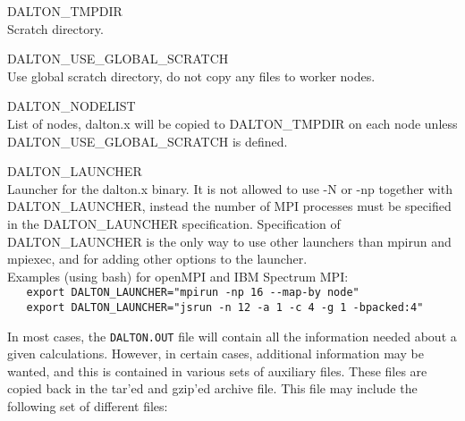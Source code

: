\begin{list}{--}{}
\item[DALTON\_TMPDIR \hfill] \hfill \\
 Scratch directory.
\item[DALTON\_USE\_GLOBAL\_SCRATCH \hfill] \hfill \\
 Use global scratch directory, do not copy any files to worker nodes.
\item[DALTON\_NODELIST \hfill] \hfill \\
 List of nodes, dalton.x will be copied to DALTON\_TMPDIR on each node unless DALTON\_USE\_GLOBAL\_SCRATCH is defined.
\item[DALTON\_LAUNCHER \hfill] \hfill \\
 Launcher for the dalton.x binary.
 It is not allowed to use -N or -np together with DALTON\_LAUNCHER, instead the number of MPI processes
 must be specified in the DALTON\_LAUNCHER specification.
 Specification of DALTON\_LAUNCHER is the only way to use other launchers than mpirun and mpiexec,
 and for adding other options to the launcher. \\
 Examples (using bash) for openMPI and IBM Spectrum MPI: \\
 \verb|   export DALTON_LAUNCHER="mpirun -np 16 --map-by node"| \\
 \verb|   export DALTON_LAUNCHER="jsrun -n 12 -a 1 -c 4 -g 1 -bpacked:4"|
\end{list}

In most cases, the \verb|DALTON.OUT| file will contain all the
information needed about a given calculations. However, in certain
cases, additional information may be wanted, and this is contained
in various sets of auxiliary files. These files are copied back in the
tar'ed and gzip'ed archive file. This file may include the following set of
different files:

